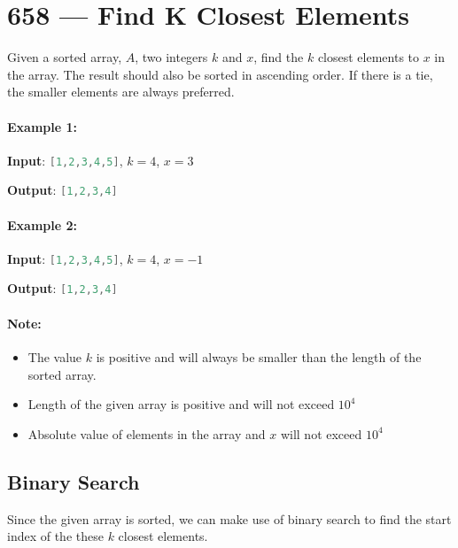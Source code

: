 \section{658 --- Find K Closest Elements}
Given a sorted array, $A$, two integers $k$ and $x$, find the $k$ closest elements to $x$ in the array. The result should also be sorted in ascending order. If there is a tie, the smaller elements are always preferred.

\paragraph{Example 1:}

\begin{flushleft}
\textbf{Input}: \lstinline[language=C++, basicstyle=\small\ttfamily, keywordstyle=\bfseries\color{green!40!black}]|[1,2,3,4,5]|, $k=4$, $x=3$

\textbf{Output}: \lstinline[language=C++, basicstyle=\small\ttfamily, keywordstyle=\bfseries\color{green!40!black}]|[1,2,3,4]|
\end{flushleft}

\paragraph{Example 2:}

\begin{flushleft}
\textbf{Input}: \lstinline[language=C++, basicstyle=\small\ttfamily, keywordstyle=\bfseries\color{green!40!black}]|[1,2,3,4,5]|, $k=4$, $x=-1$

\textbf{Output}: \lstinline[language=C++, basicstyle=\small\ttfamily, keywordstyle=\bfseries\color{green!40!black}]|[1,2,3,4]|
\end{flushleft}

\paragraph{Note:}

\begin{itemize}
\item The value $k$ is positive and will always be smaller than the length of the sorted array.
\item Length of the given array is positive and will not exceed $10^4$
\item Absolute value of elements in the array and $x$ will not exceed $10^4$
\end{itemize}

\subsection{Binary Search} 
Since the given array is sorted, we can make use of binary search to find the start index of the these $k$ closest elements.

